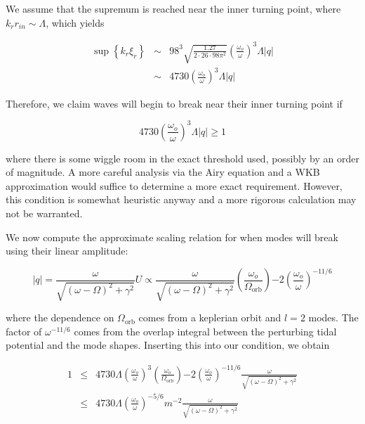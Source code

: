 We assume that the supremum is reached near the inner turning point, where $k_r r_{in} \sim \Lambda$, which yields

\begin{eqnarray}
\sup\left\{k_r \xi_r\right\} & \sim & 98^3 \sqrt{\frac{1.27}{2\cdot26\cdot98\pi^2}} \left(\frac{\omega_o}{\omega}\right)^3 \Lambda |q|\\
& \sim & 4730 \left(\frac{\omega_o}{\omega}\right)^3 \Lambda |q|
\end{eqnarray}

Therefore, we claim waves will begin to break near their inner turning point if 

\begin{equation}
4730 \left(\frac{\omega_o}{\omega}\right)^3 \Lambda |q| \geq 1
\end{equation}

where there is some wiggle room in the exact threshold used, possibly by an order of magnitude. A more careful analysis via the Airy equation and a WKB approximation would suffice to determine a more exact requirement. However, this condition is somewhat heuristic anyway and a more rigorous calculation may not be warranted. 

We now compute the approximate scaling relation for when modes will break using their linear amplitude:

\begin{equation}
|q| = \frac{\omega}{\sqrt{ (\omega-\Omega)^2 + \gamma^2}} U \propto \frac{\omega}{\sqrt{ (\omega-\Omega)^2 + \gamma^2}} \left(\frac{\omega_o}{\Omega_{\mathrm{orb}}}\right){-2} \left(\frac{\omega_o}{\omega}\right)^{-11/6}
\end{equation}

where the dependence on $\Omega_{\mathrm{orb}}$ comes from a keplerian orbit and $l=2$ modes. The factor of $\omega^{-11/6}$ comes from the overlap integral between the perturbing tidal potential and the mode shapes. Inserting this into our condition, we obtain

\begin{eqnarray}
1 & \leq & 4730 \Lambda \left(\frac{\omega_o}{\omega}\right)^3 \left(\frac{\omega_o}{\Omega_{\mathrm{orb}}}\right){-2} \left(\frac{\omega_o}{\omega}\right)^{-11/6} \frac{\omega}{\sqrt{ (\omega-\Omega)^2 + \gamma^2}} \\
  & \leq & 4730 \Lambda \left(\frac{\omega_o}{\omega}\right)^{-5/6} m^{-2} \frac{\omega}{\sqrt{ (\omega-\Omega)^2 + \gamma^2}}
\end{eqnarray}

